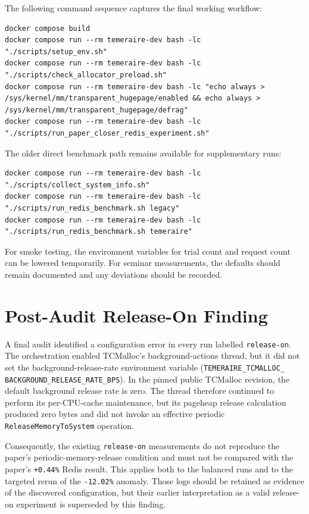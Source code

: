 \documentclass[a4paper,11pt]{article}
\begin{document}
The following command sequence captures the final working workflow:

\begin{lstlisting}[style=codestyle]
docker compose build
docker compose run --rm temeraire-dev bash -lc "./scripts/setup_env.sh"
docker compose run --rm temeraire-dev bash -lc "./scripts/check_allocator_preload.sh"
docker compose run --rm temeraire-dev bash -lc "echo always > /sys/kernel/mm/transparent_hugepage/enabled && echo always > /sys/kernel/mm/transparent_hugepage/defrag"
docker compose run --rm temeraire-dev bash -lc "./scripts/run_paper_closer_redis_experiment.sh"
\end{lstlisting}

The older direct benchmark path remains available for supplementary runs:

\begin{lstlisting}[style=codestyle]
docker compose run --rm temeraire-dev bash -lc "./scripts/collect_system_info.sh"
docker compose run --rm temeraire-dev bash -lc "./scripts/run_redis_benchmark.sh legacy"
docker compose run --rm temeraire-dev bash -lc "./scripts/run_redis_benchmark.sh temeraire"
\end{lstlisting}

For smoke testing, the environment variables for trial count and request count can be lowered temporarily.
For seminar measurements, the defaults should remain documented and any deviations should be recorded.

\section{Post-Audit Release-On Finding}
\label{sec:post-audit}

A final audit identified a configuration error in every run labelled
\texttt{release-on}. The orchestration enabled TCMalloc's background-actions
thread, but it did not set the background-release-rate environment variable
(\texttt{TEMERAIRE\_TCMALLOC\_}\allowbreak
\texttt{BACKGROUND\_RELEASE\_RATE\_BPS}). In the pinned
public TCMalloc revision, the default background release rate is zero. The
thread therefore continued to perform its per-CPU-cache maintenance, but its
pageheap release calculation produced zero bytes and did not invoke an
effective periodic \texttt{ReleaseMemoryToSystem} operation.

Consequently, the existing \texttt{release-on} measurements do not reproduce
the paper's periodic-memory-release condition and must not be compared with the
paper's \texttt{+0.44\%} Redis result. This applies both to the balanced runs
and to the targeted rerun of the \texttt{-12.02\%} anomaly. Those logs should
be retained as evidence of the discovered configuration, but their earlier
interpretation as a valid release-on experiment is superseded by this finding.
\end{document}

